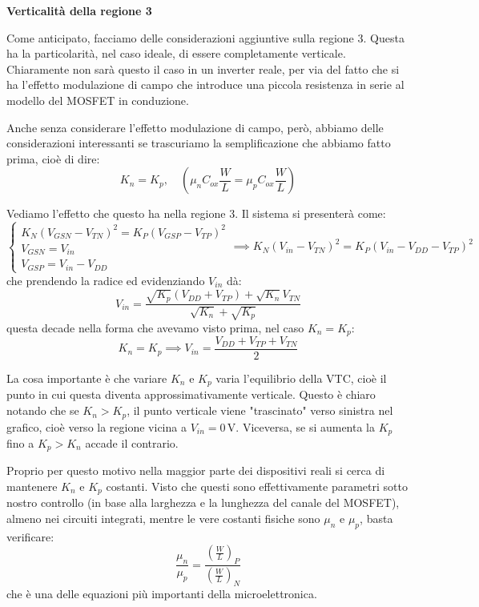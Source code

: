\documentclass[a4paper,11pt]{article}
\begin{document}
\par\smallskip

\noindent
\textbf{\textsf{Verticalità della regione 3}}

\noindent
Come anticipato, facciamo delle considerazioni aggiuntive sulla regione 3. Questa ha la particolarità, nel caso ideale, di essere completamente verticale. Chiaramente non sarà questo il caso in un inverter reale, per via del fatto che si ha l'effetto modulazione di campo che introduce una piccola resistenza in serie al modello del MOSFET in conduzione.

Anche senza considerare l'effetto modulazione di campo, però, abbiamo delle considerazioni interessanti se trascuriamo la semplificazione che abbiamo fatto prima, cioè di dire:
$$
K_n = K_p, \quad \left( \mu_n C_{ox} \frac{W}{L} = \mu_p C_{ox} \frac{W}{L} \right)
$$

Vediamo l'effetto che questo ha nella regione 3. Il sistema si presenterà come:
$$
\begin{cases}
	K_N (V_{GSN} - V_{TN})^2 = K_P (V_{GSP} - V_{TP})^2 \\
	V_{GSN} = V_{in} \\
	V_{GSP} = V_{in} - V_{DD}
\end{cases}
\implies
K_N (V_{in} - V_{TN})^2 = K_P (V_{in} - V_{DD} - V_{TP})^2
$$
che prendendo la radice ed evidenziando $V_{in}$ dà:
$$
V_{in} = \frac{\sqrt{K_p} (V_{DD} + V_{TP}) + \sqrt{K_n} V_{TN} }{\sqrt{K_n} + \sqrt{K_p}}
$$
questa decade nella forma che avevamo visto prima, nel caso $K_n = K_p$:
$$
K_n = K_p \implies V_{in} = \frac{V_{DD} + V_{TP} + V_{TN}}{2}
$$


La cosa importante è che variare $K_n$ e $K_p$ varia l'equilibrio della VTC, cioè il punto in cui questa diventa approssimativamente verticale. Questo è chiaro notando che se $K_n > K_p$, il punto verticale viene "trascinato" verso sinistra nel grafico, cioè verso la regione vicina a $V_{in} = 0 \, \mathrm{V}$. Viceversa, se si aumenta la $K_p$ fino a $K_p > K_n$ accade il contrario.

Proprio per questo motivo nella maggior parte dei dispositivi reali si cerca di mantenere $K_n$ e $K_p$ costanti. Visto che questi sono effettivamente parametri sotto nostro controllo (in base alla larghezza e la lunghezza del canale del MOSFET), almeno nei circuiti integrati, mentre le vere costanti fisiche sono $\mu_n$ e $\mu_p$, basta verificare:
$$
\frac{\mu_n}{\mu_p} = \frac{ \left( \frac{W}{L} \right)_P }{ \left( \frac{W}{L} \right)_N }
$$
che è una delle equazioni più importanti della microelettronica.
\end{document}
